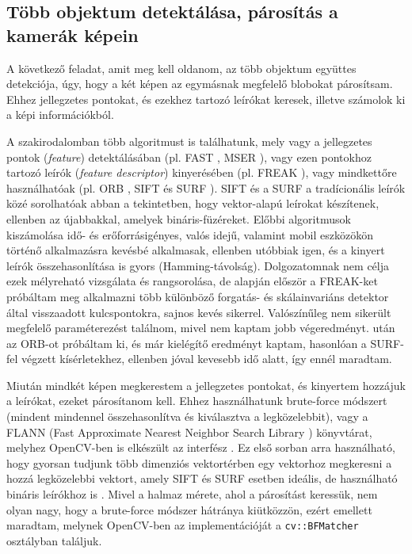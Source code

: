 \subsection{Több objektum detektálása, párosítás a kamerák képein}

A következő feladat, amit meg kell oldanom, az több objektum együttes detekciója, úgy, hogy a két képen az egymásnak megfelelő blobokat párosítsam. Ehhez jellegzetes pontokat, és ezekhez tartozó leírókat keresek, illetve számolok ki a képi információkból.

A szakirodalomban több algoritmust is találhatunk, mely vagy a jellegzetes pontok (\textit{feature}) detektálásában (pl. FAST \cite{FAST}, MSER \cite{MSER}), vagy ezen pontokhoz tartozó leírók (\textit{feature descriptor}) kinyerésében (pl. FREAK \cite{FREAK}), vagy mindkettőre használhatóak (pl. ORB \cite{ORB}, SIFT \cite{SIFT} és SURF \cite{SURF}). SIFT és a SURF a tradícionális leírók közé sorolhatóak abban a tekintetben, hogy vektor-alapú leírokat készítenek, ellenben az újabbakkal, amelyek bináris-füzéreket. Előbbi algoritmusok kiszámolása idő- és erőforrásigényes, valós idejű, valamint mobil eszközökön történő alkalmazásra kevésbé alkalmasak, ellenben utóbbiak igen, és a kinyert leírók összehasonlítása is gyors (Hamming-távolság). Dolgozatomnak nem célja ezek mélyreható vizsgálata és rangsorolása, de \cite{feature-detection-comparison} alapján először a FREAK-ket próbáltam meg alkalmazni több különböző forgatás- és skálainvariáns detektor által visszaadott kulcspontokra, sajnos kevés sikerrel. Valószínűleg nem sikerült megfelelő paraméterezést találnom, mivel nem kaptam jobb végeredményt. \cite{ORB} után az ORB-ot próbáltam ki, és már kielégítő eredményt kaptam, hasonlóan a SURF-fel végzett kísérletekhez, ellenben jóval kevesebb idő alatt, így ennél maradtam.

Miután mindkét képen megkerestem a jellegzetes pontokat, és kinyertem hozzájuk a leírókat, ezeket párosítanom kell. Ehhez használhatunk brute-force módszert (mindent mindennel összehasonlítva és kiválasztva a legközelebbit), vagy a FLANN (Fast Approximate Nearest Neighbor Search Library \cite{flann_pami_2014}) könyvtárat, melyhez OpenCV-ben is elkészült az interfész \cite{opencv-flann}. Ez első sorban arra használható, hogy gyorsan tudjunk több dimenziós vektortérben egy vektorhoz megkeresni a hozzá legközelebbi vektort, amely SIFT és SURF esetben ideális, de használható bináris leírókhoz is \cite{flann-binary}. Mivel a halmaz mérete, ahol a párosítást keressük, nem olyan nagy, hogy a brute-force módszer hátránya kiütközzön, ezért emellett maradtam, melynek OpenCV-ben az implementációját a \texttt{cv::BFMatcher} osztályban találjuk.

